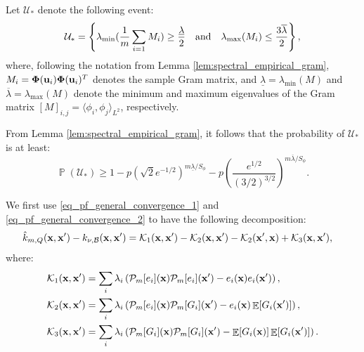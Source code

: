 \documentclass[aos,preprint]{imsart}
\theoremstyle{plain}
\DeclareMathOperator{\pr}{\mathbb P}
\DeclareMathOperator{\E}{\mathbb E}
\newcommand{\CalX}{\mathcal X}
\newcommand{\CalP}{\mathcal P}
\newcommand{\CalU}{\mathcal U}
\newcommand{\CalK}{\mathcal K}
\newcommand{\Bx}{\bold x}
\newcommand{\BFx}{\bold x}
\newcommand{\BB}{\bold B}
\newcommand{\Bu}{\bold u}
\newcommand{\BPhi}{\boldsymbol{\Phi}}
\theoremstyle{remark}
\begin{document}
\begin{appendix}

Let $\CalU_*$ denote the following event: 
\[\CalU_*=\left\{\lambda_{\rm min}(\frac{1}{m}\sum_{i=1}M_i)\geq \frac{\underline{\lambda}}{2} \quad \textrm{and} \quad \lambda_{\rm max}(M_i)\leq \frac{3\overline{\lambda}}{2}\right\},\]
where, following the notation from Lemma \ref{lem:spectral_empirical_gram},  $M_i=\BPhi(\Bu_i)\BPhi(\Bu_i)^T$ denotes the sample Gram matrix, and $\underline{\lambda}=\lambda_{\min}(M)$ and $\overline{\lambda}=\lambda_{\max}(M)$ denote the minimum and maximum eigenvalues of the Gram matrix $[M]_{i,j}=\langle\phi_i,\phi_j\rangle_{L^2}$, respectively.


From Lemma \ref{lem:spectral_empirical_gram}, it follows that the probability of $\CalU_*$ is at least:
\[\pr\left(\CalU_*\right)\geq 1-p(\sqrt{2}e^{-1/2})^{m\underline{\lambda}/S_\phi}-p(\frac{e^{1/2}}{(3/2)^{3/2}})^{m\overline{\lambda}/S_\phi}.\]


We first use \eqref{eq_pf_general_convergence_1} and \eqref{eq_pf_general_convergence_2} to have the following decomposition:
\begin{align}
    &\hat{k}_{m,Q}(\BFx,\BFx')- k_{\nu,\mathcal{B}}(\BFx,\BFx')=\CalK_1(\BFx,\BFx')-\CalK_2(\BFx,\BFx')-\CalK_2(\BFx',\BFx)+\CalK_3(\BFx,\BFx'),\label{eq_pf_general_convergence_4}
\end{align}   
where:
\begin{align*}
    &\CalK_1(\BFx,\BFx')= \sum_i\lambda_i\left(\CalP_m[e_i](\Bx)\CalP_m[e_i](\BFx')-e_i(\BFx)e_i(\BFx')\right),\\
    &\CalK_2(\BFx,\BFx')=\sum_i\lambda_i\left(\CalP_m[e_i](\BFx)\CalP_m[G_i](\BFx')-e_i(\BFx)\E[G_i(\BFx')]\right),\\
     &\CalK_3(\BFx,\BFx')=\sum_i\lambda_i\left(\CalP_m[G_i](\BFx)\CalP_m[G_i](\BFx')-\E[G_i(\BFx)]\E [G_i(\Bx')]\right).
\end{align*}




\end{appendix}
\end{document}
